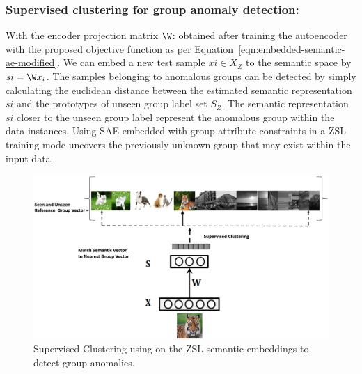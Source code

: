 \subsubsection{ Supervised clustering  for group anomaly detection: }
With the encoder projection matrix $\W$:  obtained after training the autoencoder with the proposed objective function as per Equation~\ref{eqn:embedded-semantic-ae-modified}. We can embed
a new test sample $xi \in X_Z$ to the semantic space by $si = \W x_i$.
The samples belonging to anomalous groups can be detected by simply calculating
the euclidean distance between the estimated semantic
representation $si$ and the prototypes of unseen group label set $S_Z$. The semantic representation $si$ closer to the unseen group label represent the anomalous group within the data instances. Using SAE embedded with group attribute constraints in a ZSL training mode uncovers the previously unknown group that may exist within the input data.

\begin{figure}[t]
\includegraphics[scale=0.50]{images/encoderGrpEmbedding}
\centering
\caption{Supervised Clustering using on the ZSL semantic embeddings to detect group anomalies. }
\label{fig:encoderGrpEmbedding}
\end{figure}



